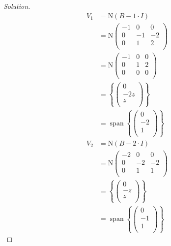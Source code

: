 \documentclass[fleqn, a4paper, 12pt]{article}
\newcommand{\N}{\mathrm{N}}
\theoremstyle{definition}
\theoremstyle{theorem}
\newenvironment{solution}
{\begin{proof}[Solution]\let\qed\relax}
	{\end{proof}}
\DeclareMathOperator{\vspan}{\mathrm{span}} %
\begin{document}
\begin{solution}
	\begin{align*}
		V_1 &= \N (B - 1 \cdot I)\\
		&= \N 
			\begin{pmatrix}
				-1 & 0 & 0\\
				0 & -1 & -2\\
				0 & 1 & 2\\
			\end{pmatrix}\\
		&= \N
			\begin{pmatrix}
				-1 & 0 & 0\\
				0 & 1 & 2\\
				0 & 0 & 0\\
			\end{pmatrix}\\
		&= 
			\left\lbrace
				\begin{pmatrix}
					0\\
					-2z\\
					z\\
				\end{pmatrix}
			\right\rbrace\\
		&= \vspan
			\left\lbrace
				\begin{pmatrix}
					0\\
					-2\\
					1\\
				\end{pmatrix}
			\right\rbrace
	\end{align*}
	\begin{align*}
		V_2 &= \N (B - 2 \cdot I)\\
		&= \N
			\begin{pmatrix}
				-2 & 0 & 0\\
				0 & -2 & -2\\
				0 & 1 & 1\\
			\end{pmatrix}\\
		&= 
			\left\lbrace
				\begin{pmatrix}
					0\\
					-z\\
					z\\
				\end{pmatrix}
			\right\rbrace\\
		&= \vspan
			\left\lbrace
				\begin{pmatrix}
					0\\
					-1\\
					1\\
				\end{pmatrix}
			\right\rbrace
	\end{align*}
\end{solution}
\end{document}
